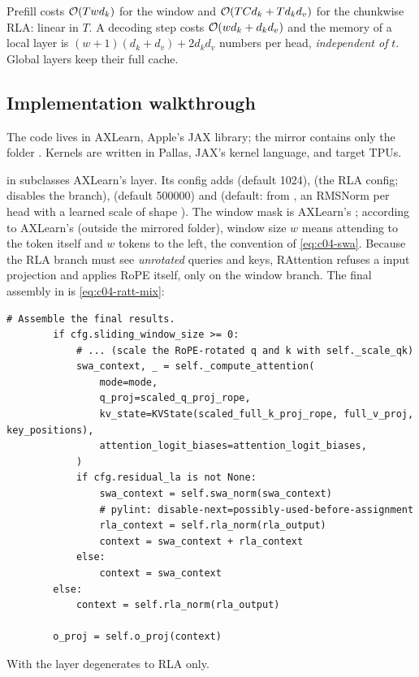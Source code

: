 Prefill costs $\mathcal{O}(Twd_k)$ for the window and $\mathcal{O}(TCd_k+Td_kd_v)$ for the chunkwise RLA:
linear in $T$. A decoding step costs $\mathcal{O}(wd_k+d_kd_v)$ and the memory of a local layer is
$(w+1)(d_k+d_v)+2d_kd_v$ numbers per head, \emph{independent of} $t$. Global layers keep their
full cache.

\subsection{Implementation walkthrough}

The code lives in AXLearn, Apple's JAX library; the mirror contains only the folder
. Kernels are written in Pallas, JAX's
kernel language, and target TPUs.

\begin{implnote}[title={In the code: the \texttt{RAttention} layer}]
 in 
subclasses AXLearn's  layer. Its config adds 
(default 1024),  (the RLA config;  disables the branch),
 (default 500000) and  (default:  from
, an RMSNorm per head with a
learned scale of shape ). The window mask is AXLearn's
; according to AXLearn's  (outside the
mirrored folder), window size $w$ means attending to the token itself and $w$ tokens to the left,
the convention of \eqref{eq:c04-swa}. Because the RLA branch must see \emph{unrotated} queries and
keys, RAttention refuses a  input projection and applies RoPE itself, only
on the window branch. The final assembly in  is
\eqref{eq:c04-ratt-mix}:
\begin{lstlisting}[caption={Excerpt from \texttt{repos/\allowbreak{}apple\_\_axlearn/\allowbreak{}axlearn/\allowbreak{}common/\allowbreak{}rattention/\allowbreak{}rattention.py}},label={lst:c04-ratt-mix}]
        # Assemble the final results.
        if cfg.sliding_window_size >= 0:
            # ... (scale the RoPE-rotated q and k with self._scale_qk)
            swa_context, _ = self._compute_attention(
                mode=mode,
                q_proj=scaled_q_proj_rope,
                kv_state=KVState(scaled_full_k_proj_rope, full_v_proj, key_positions),
                attention_logit_biases=attention_logit_biases,
            )
            if cfg.residual_la is not None:
                swa_context = self.swa_norm(swa_context)
                # pylint: disable-next=possibly-used-before-assignment
                rla_context = self.rla_norm(rla_output)
                context = swa_context + rla_context
            else:
                context = swa_context
        else:
            context = self.rla_norm(rla_output)

        o_proj = self.o_proj(context)
\end{lstlisting}
With  the layer degenerates to RLA only.
\end{implnote}

